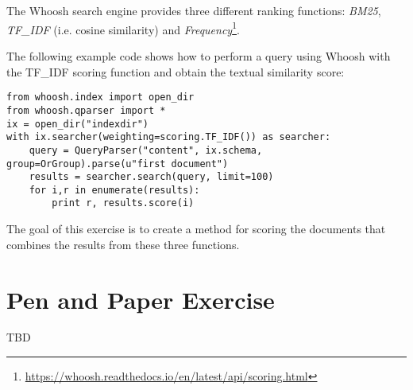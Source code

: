 \documentclass[12pt]{article}
\begin{document}

\section{}

The Whoosh search engine provides three different ranking functions: \emph{BM25}, \emph{TF_IDF} (i.e. cosine similarity) and \emph{Frequency}\footnote{\url{https://whoosh.readthedocs.io/en/latest/api/scoring.html}}. 

The following example code shows how to perform a query using Whoosh with the
TF_IDF scoring function and obtain the textual similarity score:
\begin{verbatim}
from whoosh.index import open_dir
from whoosh.qparser import *
ix = open_dir("indexdir")
with ix.searcher(weighting=scoring.TF_IDF()) as searcher:
    query = QueryParser("content", ix.schema, group=OrGroup).parse(u"first document")
    results = searcher.search(query, limit=100)
    for i,r in enumerate(results):
        print r, results.score(i)
\end{verbatim}

The goal of this exercise is to create a method for scoring the documents that combines the results from these three functions.

\section{Pen and Paper Exercise}

TBD
\end{document}
